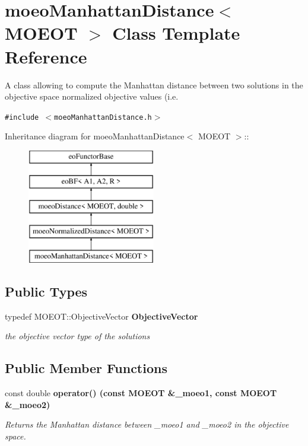 \section{moeo\-Manhattan\-Distance$<$ MOEOT $>$ Class Template Reference}
\label{classmoeoManhattanDistance}
A class allowing to compute the Manhattan distance between two solutions in the objective space normalized objective values (i.e.  


{\tt \#include $<$moeo\-Manhattan\-Distance.h$>$}

Inheritance diagram for moeo\-Manhattan\-Distance$<$ MOEOT $>$::\begin{figure}[H]
\begin{center}
\leavevmode
\includegraphics[height=5cm]{classmoeoManhattanDistance}
\end{center}
\end{figure}
\subsection*{Public Types}
\begin{CompactItemize}
\item 
typedef MOEOT::Objective\-Vector \bf{Objective\-Vector}\label{classmoeoManhattanDistance_44fa512b80d2eee94e876a95babc9913}

\begin{CompactList}\small\item\em the objective vector type of the solutions \item\end{CompactList}\end{CompactItemize}
\subsection*{Public Member Functions}
\begin{CompactItemize}
\item 
const double \bf{operator()} (const MOEOT \&\_\-moeo1, const MOEOT \&\_\-moeo2)
\begin{CompactList}\small\item\em Returns the Manhattan distance between \_\-moeo1 and \_\-moeo2 in the objective space. \item\end{CompactList}\end{CompactItemize}


